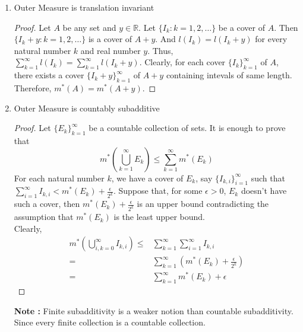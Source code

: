 \begin{enumerate}
\begin{proof}
	By monotonicity of outer measure, we have $m^\ast(J_1) \le m^\ast(I) \le m^\ast(J_2)$.
	However $m^\ast(J_1) = l(I)-\epsilon$ and $m^\ast(J_2) = l(I)+\epsilon$.
	Thus, $l(I)-\epsilon \le m^\ast(I) \le l(I)+\epsilon$.
	Therefore, $m^\ast(I) = l(I)$.

	\textbf{Case 3 : Unbounded Interval}
	Let $I$ be an unbounded interval.
	Then for any natural number $n$, there exists a closed bounded interval $J$ such that $J \subset I$ and $l(J) = n$.
	And $n = m^\ast(J) \le m^\ast(I),\ \forall n \in \mathbb{N}$.
	Therefore, $m^\ast(I) = \infty = l(I)$. 
	\end{proof}
	\item Outer Measure is translation invariant
	\begin{proof}
	Let $A$ be any set and $y \in \mathbb{R}$.
	Let $\{ I_k : k = 1,2,\dots \}$ be a cover of $A$.
	Then $\{ I_k+y : k = 1,2,\dots \}$ is a cover of $A+y$.
	And $l(I_k) = l(I_k+y)$ for every natural number $k$ and real number $y$.
	Thus, $\displaystyle\sum_{k=1}^\infty l(I_k) = \displaystyle\sum_{k=1}^\infty l(I_k+y)$.
	Clearly, for each cover $\{I_k\}_{k=1}^\infty$ of $A$, there exists a cover $\{ I_k+y \}_{k=1}^\infty$ of $A+y$ containing intevals of same length.
	Therefore, $m^\ast(A) = m^\ast(A+y)$.
	\end{proof}
	\item Outer Measure is countably subadditive
	\begin{proof}
	Let $\{E_k\}_{k=1}^\infty$ be a countable collection of sets.
	It is enough to prove that
		\begin{equation}
			m^\ast \left( \bigcup_{k=1}^\infty E_k \right) \le \sum_{k=1}^\infty m^\ast(E_k)
		\end{equation}
		For each natural number $k$, we have a cover of $E_k$, say $\{ I_{k,i} \}_{i = 1}^\infty$ such that $\displaystyle\sum_{i=1}^\infty I_{k,i} < m^\ast(E_k) + \frac{\epsilon}{2^k}$.
		Suppose that, for some $\epsilon > 0$, $E_k$ doesn't have such a cover, then $m^\ast(E_k) + \frac{\epsilon}{2^k}$ is an upper bound contradicting the assumption that $m^\ast(E_k)$ is the least upper bound.\\

	Clearly,
	\begin{align*}
		m^\ast \left( \bigcup_{i,k = 0}^\infty I_{k,i} \right) \le & \sum_{k=1}^\infty \sum_{i=1}^\infty I_{k,i} \\
		= & \sum_{k=1}^\infty \left( m^\ast(E_k) + \frac{\epsilon}{2^k} \right) \\
		= & \sum_{k=1}^\infty  m^\ast(E_k) + \epsilon
	\end{align*}
	\end{proof}
	\textbf{Note : } Finite subadditivity is a weaker notion than countable subadditivity.
	Since every finite collection is a countable collection.
\end{enumerate}

